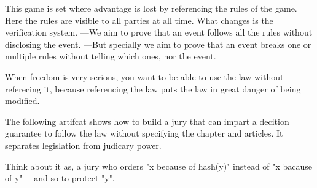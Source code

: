 This game is set where advantage is lost by referencing the rules of the game. 
Here the rules are visible to all parties at all time. What changes is the verification system. 
---We aim to prove that an event follows all the rules without disclosing the event. 
---But specially we aim to prove that an event breaks one or multiple rules without telling which ones, nor the event. 

When freedom is very serious, you want to be able to use the law without referecing it, because 
referencing the law puts the law in great danger of being modified. 

The following artifcat shows how to build a jury that can impart a decition guarantee to follow the law 
without specifying the chapter and articles. It separates legislation from judicary power. 

Think about it as, a jury who orders "x because of hash(y)" instead of "x bacause of y" ---and so to protect "y". 
